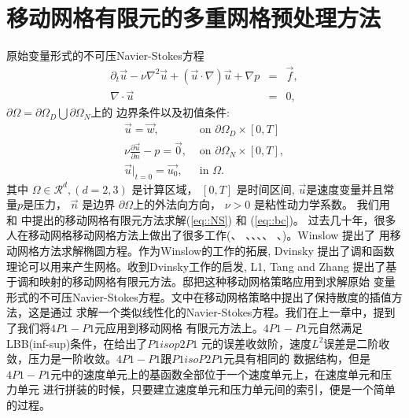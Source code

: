 

\chapter{移动网格有限元的多重网格预处理方法}
    \label{chapter:AMG_preconditioner}
    原始变量形式的不可压Navier-Stokes方程
    \begin{equation}
      \begin{array}{rcl}
         \partial_t \vec{u} - \nu \nabla^2 \vec{u} +
        (\vec{u} \cdot \nabla )\vec{u} + \nabla p & =
        & \vec{f},\\
        \nabla \cdot \vec{u} & = & 0,
      \end{array}
      \label{eq::NS}
    \end{equation}
    $\partial \Omega = \partial \Omega_D \bigcup \partial \Omega_N$上的
    边界条件以及初值条件:
    \begin{equation}
      \begin{array}{ll}
        \vec{u} = \vec{w},& \mbox{ on } \partial \Omega_D \times [0,
        T]\\
        \nu \displaystyle \frac{\partial \vec{u}}{\partial n} - p =
        \vec{0}, & \mbox{ on } \partial \Omega_N \times [0, T],  \\
        \vec{u}|_{t = 0} = \vec{u_0}, & \mbox{ in } \Omega.
      \end{array}
      \label{eq::bc}
    \end{equation}
    其中 $\Omega \in \mathcal{R}^d,(d = 2, 3)$ 是计算区域，
    $[0,T]$ 是时间区间, $\vec{u}$是速度变量并且常量$p$是压力， $\vec{n}$ 是边界
    $\partial \Omega$上的外法向方向， $\nu > 0$ 是粘性动力学系数。
    我们用\cite{li2001mesh} 和 \cite{di2005}中提出的移动网格有限元方法求解(\ref{eq::NS}) 和 (\ref{eq::bc})。
    过去几十年，很多人在移动网格移动网格方法上做出了很多工作(\cite{cao1999adaptive}、
    \cite{cao2003moving}、\cite{di2005moving}、\cite{di2007level}、\cite{di2007moving}、
    \cite{li2001PHDthesis}、\cite{li2006moving})。Winslow \cite{Winslow1966NUMERICAL} 提出了
    用移动网格方法求解椭圆方程。作为Winslow的工作的拓展, Dvinsky \cite{dvinsky1991adaptive}
    提出了调和函数理论可以用来产生网格。收到Dvinsky工作的启发, L1, Tang and Zhang \cite{li2001mesh}
    提出了基于调和映射的移动网格有限元方法。邸\cite{di2005moving}把这种移动网格策略应用到求解原始
    变量形式的不可压Navier-Stokes方程。文中在移动网格策略中提出了保持散度的插值方法，这是通过
    求解一个类似线性化的Navier-Stokes方程。我们在上一章中，提到了我们将$4P1-P1$元应用到移动网格    有限元方法上。$4P1-P1$元自然满足LBB(inf-sup)条件，在\cite{bercovier1979error}给出了$P1isop2P1$
    元的误差收敛阶，速度$L^2$误差是二阶收敛，压力是一阶收敛。$4P1-P1$跟$P1isoP2P1$元具有相同的
    数据结构，但是$4P1-P1$元中的速度单元上的基函数全部位于一个速度单元上，在速度单元和压力单元
    进行拼装的时候，只要建立速度单元和压力单元间的索引，便是一个简单的过程。

